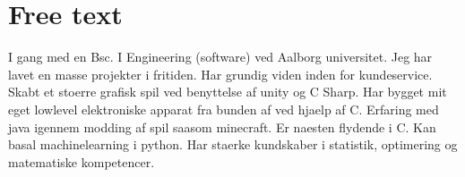 \section{Free text}
I gang med en Bsc. I Engineering (software) ved Aalborg universitet.
Jeg har lavet en masse projekter i fritiden.
Har grundig viden inden for kundeservice.
Skabt et stoerre grafisk spil ved benyttelse af unity og C Sharp.
Har bygget mit eget lowlevel elektroniske apparat fra bunden af ved hjaelp af C.
Erfaring med java igennem modding af spil saasom minecraft.
Er naesten flydende i C.
Kan basal machinelearning i python.
Har staerke kundskaber i statistik, optimering og matematiske kompetencer.

